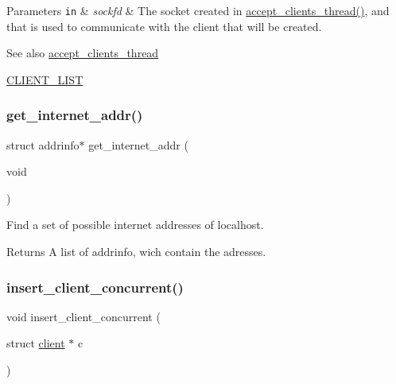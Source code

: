 \begin{DoxyParams}[1]{Parameters}
\mbox{\tt in}  & {\em sockfd} & The socket created in \hyperlink{zip-zop-server_8c_a8c505192e7c73e767d53f7d282cfb646}{accept\+\_\+clients\+\_\+thread()}, and that is used to communicate with the client that will be created.\\
\hline
\end{DoxyParams}
\begin{DoxySeeAlso}{See also}
\hyperlink{zip-zop-server_8c_a8c505192e7c73e767d53f7d282cfb646}{accept\+\_\+clients\+\_\+thread} 

\hyperlink{zip-zop-server_8c_a32076dcdfaf1057a014d74d01cc7e08e}{C\+L\+I\+E\+N\+T\+\_\+\+L\+I\+ST} 
\end{DoxySeeAlso}
\mbox{\label{zip-zop-server_8c_a2d9748875d07382b9dbecb97c6cd9b62}} 
\subsubsection{\texorpdfstring{get\+\_\+internet\+\_\+addr()}{get\_internet\_addr()}}
{\footnotesize\ttfamily struct addrinfo$\ast$ get\+\_\+internet\+\_\+addr (\begin{DoxyParamCaption}\item[{void}]{ }\end{DoxyParamCaption})}



Find a set of possible internet addresses of localhost. 

\begin{DoxyReturn}{Returns}
A list of addrinfo, wich contain the adresses. 
\end{DoxyReturn}
\mbox{\label{zip-zop-server_8c_a84f39912128d6dc7a66bbdd88fad00b5}} 
\subsubsection{\texorpdfstring{insert\+\_\+client\+\_\+concurrent()}{insert\_client\_concurrent()}}
{\footnotesize\ttfamily void insert\+\_\+client\+\_\+concurrent (\begin{DoxyParamCaption}\item[{struct \hyperlink{structclient}{client} $\ast$}]{c }\end{DoxyParamCaption})}



